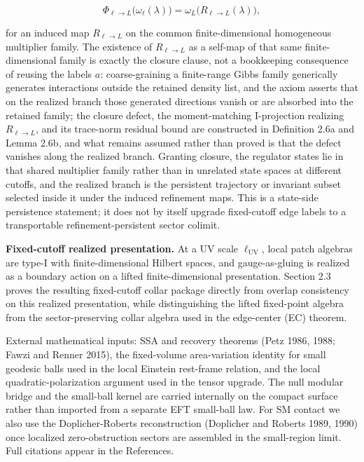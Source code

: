 \[
\Phi_{\ell\to L}\bigl(\omega_{\ell}(\lambda)\bigr)=\omega_{L}\!\bigl(R_{\ell\to L}(\lambda)\bigr),
\]

for an induced map \(R_{\ell\to L}\) on the common finite-dimensional homogeneous multiplier family. The existence of \(R_{\ell\to L}\) as a self-map of that same finite-dimensional family is exactly the closure clause, not a bookkeeping consequence of reusing the labels \(a\): coarse-graining a finite-range Gibbs family generically generates interactions outside the retained density list, and the axiom asserts that on the realized branch those generated directions vanish or are absorbed into the retained family; the closure defect, the moment-matching I-projection realizing \(R_{\ell\to L}\), and its trace-norm residual bound are constructed in Definition 2.6a and Lemma 2.6b, and what remains assumed rather than proved is that the defect vanishes along the realized branch. Granting closure, the regulator states lie in that shared multiplier family rather than in unrelated state spaces at different cutoffs, and the realized branch is the persistent trajectory or invariant subset selected inside it under the induced refinement maps. This is a state-side persistence statement; it does not by itself upgrade fixed-cutoff edge labels to a transportable refinement-persistent sector colimit.

\textbf{Fixed-cutoff realized presentation.} At a UV scale \(\ell_{\mathrm{UV}}\), local patch algebras are type-I with finite-dimensional Hilbert spaces, and gauge-as-gluing is realized as a boundary action on a lifted finite-dimensional presentation. Section 2.3 proves the resulting fixed-cutoff collar package directly from overlap consistency on this realized presentation, while distinguishing the lifted fixed-point algebra from the sector-preserving collar algebra used in the edge-center (EC) theorem.

External mathematical inputs: SSA and recovery theorems (Petz 1986, 1988; Fawzi and Renner 2015), the fixed-volume area-variation identity for small geodesic balls used in the local Einstein rest-frame relation, and the local quadratic-polarization argument used in the tensor upgrade. The null modular bridge and the small-ball kernel are carried internally on the compact surface rather than imported from a separate EFT small-ball law. For SM contact we also use the Doplicher-Roberts reconstruction (Doplicher and Roberts 1989, 1990) once localized zero-obstruction sectors are assembled in the small-region limit. Full citations appear in the References.

